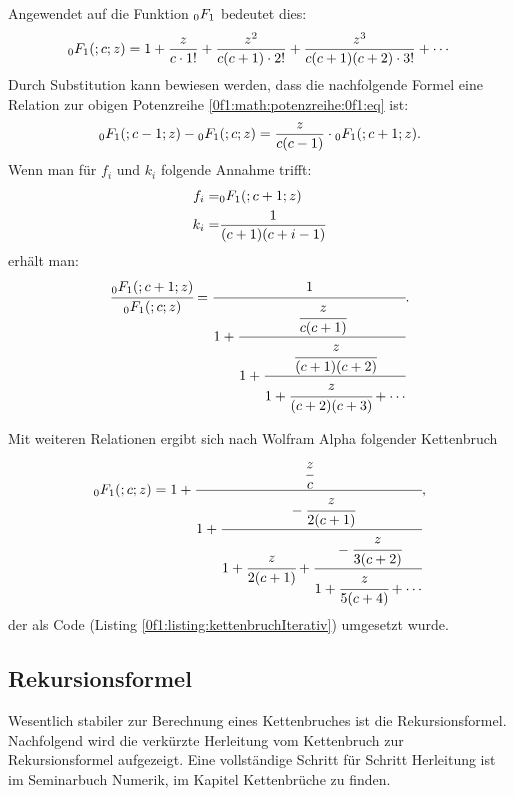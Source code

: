 Angewendet auf die Funktion $\mathstrut_0F_1$ bedeutet dies:
\begin{equation}
	\label{0f1:math:potenzreihe:0f1:eq}
	\mathstrut_0F_1(;c;z) = 1 + \frac{z}{c\cdot1!} + \frac{z^2}{c(c+1)\cdot2!} + \frac{z^3}{c(c+1)(c+2)\cdot3!} + \cdots
\end{equation}
Durch Substitution kann bewiesen werden, dass die nachfolgende Formel eine Relation zur obigen Potenzreihe \eqref{0f1:math:potenzreihe:0f1:eq} ist:
\begin{equation*}
	\mathstrut_0F_1(;c-1;z) - \mathstrut_0F_1(;c;z) = \frac{z}{c(c-1)} \cdot \mathstrut_0F_1(;c+1;z).
\end{equation*}
Wenn man für $f_i$ und $k_i$ folgende Annahme trifft:
\begin{align*}
	f_i =& \mathstrut_0F_1(;c+1;z)\\
	k_i	=& \frac{1}{(c+1)(c+i-1)}
\end{align*}
erhält man:
\begin{equation*}
	\cfrac{\mathstrut_0F_1(;c+1;z)}{\mathstrut_0F_1(;c;z)} = \cfrac{1}{1+\cfrac{\cfrac{z}{c(c+1)}}{1+\cfrac{\cfrac{z}{(c+1)(c+2)}}{1+\cfrac{z}{(c+2)(c+3)} + \cdots}}}.
\end{equation*}

Mit weiteren Relationen ergibt sich nach Wolfram Alpha \cite{0f1:wolfram-0f1} folgender Kettenbruch
\begin{equation}
	\label{0f1:math:kettenbruch:0f1:eq}
	\mathstrut_0F_1(;c;z) = 1 + \cfrac{\cfrac{z}{c}}{1+\cfrac{-\cfrac{z}{2(c+1)}}{1+\cfrac{z}{2(c+1)}+\cfrac{-\cfrac{z}{3(c+2)}}{1+\cfrac{z}{5(c+4)} + \cdots}}},
\end{equation}
der als Code (Listing \ref{0f1:listing:kettenbruchIterativ})  umgesetzt wurde. 




\subsection{Rekursionsformel
\label{0f1:subsection:rekursionsformel}}
Wesentlich stabiler zur Berechnung eines Kettenbruches ist die Rekursionsformel. Nachfolgend wird die verkürzte Herleitung vom Kettenbruch zur Rekursionsformel aufgezeigt. Eine vollständige Schritt für Schritt Herleitung ist im Seminarbuch Numerik, im Kapitel Kettenbrüche \cite{0f1:kettenbrueche} zu finden.


